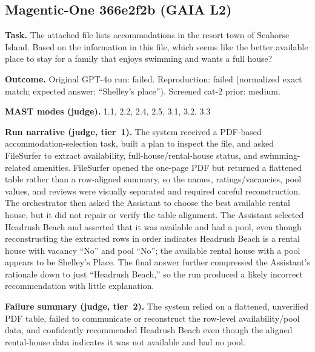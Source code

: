 \subsection*{Magentic-One 366e2f2b (GAIA L2)}
\textbf{Task.} The attached file lists accommodations in the resort town of Seahorse Island. Based on the information in this file, which seems like the better available place to stay for a family that enjoys swimming and wants a full house?

\textbf{Outcome.} Original GPT-4o run: failed. Reproduction: failed (normalized exact match; expected answer: ``Shelley's place''). Screened cat-2 prior: medium.

\textbf{MAST modes (judge).} 1.1, 2.2, 2.4, 2.5, 3.1, 3.2, 3.3

\textbf{Run narrative (judge, tier~1).} The system received a PDF-based accommodation-selection task, built a plan to inspect the file, and asked FileSurfer to extract availability, full-house/rental-house status, and swimming-related amenities. FileSurfer opened the one-page PDF but returned a flattened table rather than a row-aligned summary, so the names, ratings/vacancies, pool values, and reviews were visually separated and required careful reconstruction. The orchestrator then asked the Assistant to choose the best available rental house, but it did not repair or verify the table alignment. The Assistant selected Headrush Beach and asserted that it was available and had a pool, even though reconstructing the extracted rows in order indicates Headrush Beach is a rental house with vacancy ``No'' and pool ``No''; the available rental house with a pool appears to be Shelley's Place. The final answer further compressed the Assistant's rationale down to just ``Headrush Beach,'' so the run produced a likely incorrect recommendation with little explanation.

\textbf{Failure summary (judge, tier~2).} The system relied on a flattened, unverified PDF table, failed to communicate or reconstruct the row-level availability/pool data, and confidently recommended Headrush Beach even though the aligned rental-house data indicates it was not available and had no pool.

